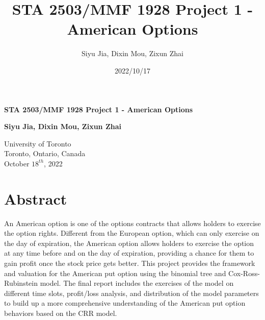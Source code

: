 \documentclass[12pt]{article}
\title{STA 2503/MMF 1928 Project 1 - American Options}
\author{Siyu Jia, Dixin Mou, Zixun Zhai}
\date{2022/10/17}
\begin{document}
\begin{titlepage}
  \begin{center}
      \vspace*{7cm}

      \textbf{STA 2503/MMF 1928 Project 1 - American Options}

           
      \vspace{1.5cm}

      \textbf{Siyu Jia, Dixin Mou, Zixun Zhai}

      \vfill
           
           
      \vspace{0.8cm}
           
      University of Toronto\\
      Toronto, Ontario, Canada\\
      October $18^{th}$, 2022 
           
  \end{center}
\end{titlepage}


\section{Abstract}
An American option is one of the options contracts that allows holders to exercise the option rights. Different from the European option, which can only exercise on the day of expiration, 
the American option allows holders to exercise the option at any time before and on the day of expiration, providing a chance for them to gain profit once the stock price gets better. 
This project provides the framework and valuation for the American put option using the binomial tree and Cox-Ross-Rubinstein model. The final report includes the exercises of the model 
on different time slots, profit/loss analysis, and distribution of the model parameters to build up a more comprehensive understanding of the American put option behaviors based on the CRR model. 

\newpage
\tableofcontents

\newpage
\listoffigures

\newpage
\end{document}
